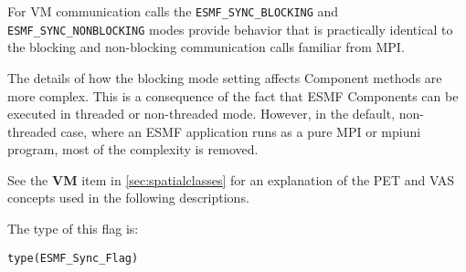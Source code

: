 For VM communication calls the {\tt ESMF\_SYNC\_BLOCKING} and {\tt ESMF\_SYNC\_NONBLOCKING}
modes provide behavior that is practically identical to the blocking and
non-blocking communication calls familiar from MPI.

The details of how the blocking mode setting affects Component methods are
more complex. This is a consequence of the fact that ESMF Components can be
executed in threaded or non-threaded mode. However, in the default,
non-threaded case, where an ESMF application runs as a pure MPI or mpiuni
program, most of the complexity is removed.

See the {\bf VM} item in \ref{sec:spatialclasses} for an
explanation of the PET and VAS concepts used in the following
descriptions.
         
The type of this flag is:

{\tt type(ESMF\_Sync\_Flag)}

